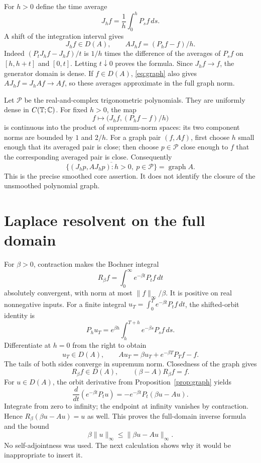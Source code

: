 \documentclass[11pt]{article}
\newcommand{\T}{\mathbb T}\newcommand{\D}{\mathbb D}
\begin{document}
For $h>0$ define the time average
\begin{equation}\label{eq:average}
 J_h f=\frac1h\int_0^hP_sf\,ds.
\end{equation}
A shift of the integration interval gives
\begin{equation}\label{eq:averagegraph}
 J_hf\in D(A),\qquad AJ_hf=(P_hf-f)/h.
\end{equation}
Indeed $(P_tJ_hf-J_hf)/t$ is $1/h$ times the
difference of the averages of $P_sf$ on $[h,h+t]$
and $[0,t]$. Letting $t\downarrow0$ proves the formula.
Since $J_hf\to f$, the generator domain is dense.
If $f\in D(A)$, \eqref{eq:graph} also gives
$AJ_hf=J_hAf\to Af$, so these averages approximate in
the full graph norm.

Let $\mathcal P$ be the real-and-complex trigonometric
polynomials. They are uniformly dense in $C(\T;\C)$.
For fixed $h>0$, the map
\[
 f\longmapsto \bigl(J_hf,(P_hf-f)/h\bigr)
\]
is continuous into the product of supremum-norm spaces:
its two component norms are bounded by $1$ and $2/h$.
For a graph pair $(f,Af)$, first choose $h$ small enough
that its averaged pair is close; then choose
$p\in\mathcal P$ close enough to $f$ that the corresponding
averaged pair is close. Consequently
\begin{equation}\label{eq:core}
 \overline{\{(J_hp,AJ_hp):h>0,\ p\in\mathcal P\}}
       =\operatorname{graph}A.
\end{equation}
This is the precise smoothed core assertion. It does
not identify the closure of the unsmoothed polynomial graph.

\section{Laplace resolvent on the full domain}
For $\beta>0$, contraction makes the Bochner integral
\[
 R_\beta f=\int_0^\infty e^{-\beta t}P_tf\,dt
\]
absolutely convergent, with norm at most
$\|f\|_\infty/\beta$. It is positive on real nonnegative
inputs. For a finite integral $u_T=\int_0^T
e^{-\beta t}P_tf\,dt$, the shifted-orbit identity is
\[
 P_hu_T=e^{\beta h}\int_h^{T+h}e^{-\beta s}P_sf\,ds.
\]
Differentiate at $h=0$ from the right to obtain
\begin{equation}\label{eq:finitelaplace}
 u_T\in D(A),\qquad
 Au_T=\beta u_T+e^{-\beta T}P_Tf-f.
\end{equation}
The tails of both sides converge in supremum norm.
Closedness of the graph gives
\begin{equation}\label{eq:rightinverse}
 R_\beta f\in D(A),\qquad (\beta-A)R_\beta f=f.
\end{equation}
For $u\in D(A)$, the orbit derivative from
Proposition~\ref{prop:graph} yields
\[
 \frac{d}{dt}(e^{-\beta t}P_tu)
 =-e^{-\beta t}P_t(\beta u-Au).
\]
Integrate from zero to infinity; the endpoint at infinity
vanishes by contraction. Hence
$R_\beta(\beta u-Au)=u$ as well.
This proves the full-domain inverse formula and the bound
\[
 \beta\|u\|_\infty\leq\|\beta u-Au\|_\infty.
\]
No self-adjointness was used. The next calculation shows
why it would be inappropriate to insert it.
\end{document}
